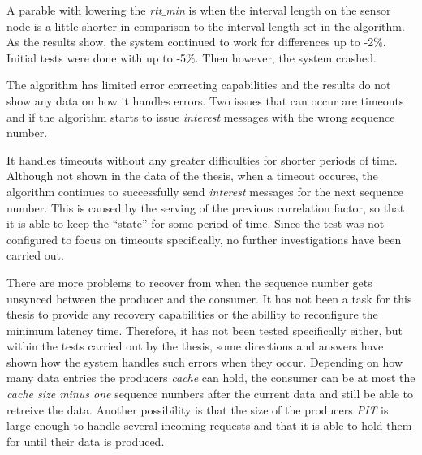 A parable with lowering the \textit{rtt$\_$min} is when the interval length on the sensor node is a little shorter in comparison to the interval length set in the algorithm. 
As the results show, the system continued to work for differences up to -2$\%$. Initial tests were done with up to -5$\%$. Then however, the system crashed.

The algorithm has limited error correcting capabilities and the results do not show any data on how it handles errors. Two issues that can occur are timeouts and if the algorithm starts to issue \textit{interest} messages with the wrong sequence number. 

It handles timeouts without any greater difficulties for shorter periods of time. Although not shown in the data of the thesis, when a timeout occures, the algorithm continues to successfully send \textit{interest} messages for the next sequence number. This is caused by the serving of the previous correlation factor, so that it is able to keep the ``state'' for some period of time. Since the test was not configured to focus on timeouts specifically, no further investigations have been carried out.

There are more problems to recover from when the sequence number gets unsynced between the producer and the consumer. 
It has not been a task for this thesis to provide any recovery capabilities or the abillity to reconfigure the minimum latency time. Therefore, it has not been tested specifically either, but within the tests carried out by the thesis, some directions and answers have shown how the system handles such errors when they occur.
Depending on how many data entries the producers \textit{cache} can hold, the consumer can be at most the \textit{cache size minus one} sequence numbers after the current data and still be able to retreive the data. 
Another possibility is that the size of the producers \textit{PIT} is large enough to handle several incoming requests and that it is able to hold them for until their data is produced. 




%


